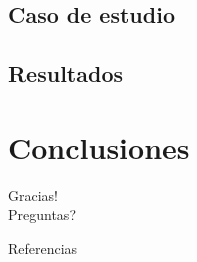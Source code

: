 \documentclass[10pt]{beamer}
\begin{document}
\subsection{Caso de estudio}

\subsection{Resultados}


\section{Conclusiones}



\begin{frame}[standout]
  Gracias!\\
  
  Preguntas?
\end{frame}

\nocite{*}
\begin{frame}[allowframebreaks]{Referencias}
  
  
\end{frame}
\end{document}
